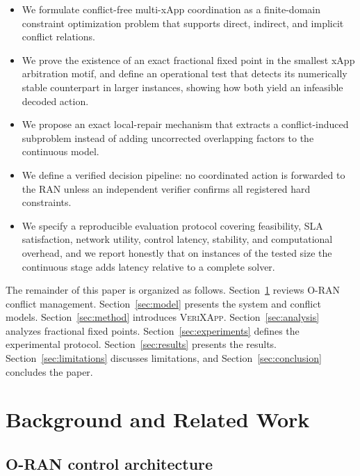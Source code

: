 \documentclass[pdflatex,sn-mathphys-num,iicol,oneside]{sn-jnl}
\newcommand{\method}{\textsc{VeriXApp}}
\begin{document}
\begin{itemize}
    \item We formulate conflict-free multi-xApp coordination as a
    finite-domain constraint optimization problem that supports
    direct, indirect, and implicit conflict relations.

    \item We prove the existence of an exact fractional fixed point in
    the smallest xApp arbitration motif, and define an operational
    test that detects its numerically stable counterpart in larger
    instances, showing how both yield an infeasible decoded action.

    \item We propose an exact local-repair mechanism that extracts a
    conflict-induced subproblem instead of adding uncorrected
    overlapping factors to the continuous model.

    \item We define a verified decision pipeline: no coordinated
    action is forwarded to the RAN unless an independent verifier
    confirms all registered hard constraints.

    \item We specify a reproducible evaluation protocol covering
    feasibility, SLA satisfaction, network utility, control latency,
    stability, and computational overhead, and we report honestly
    that on instances of the tested size the continuous stage adds
    latency relative to a complete solver.
\end{itemize}

The remainder of this paper is organized as follows.
Section~\ref{sec:background} reviews O-RAN conflict management.
Section~\ref{sec:model} presents the system and conflict models.
Section~\ref{sec:method} introduces \method.
Section~\ref{sec:analysis} analyzes fractional fixed points.
Section~\ref{sec:experiments} defines the experimental protocol.
Section~\ref{sec:results} presents the results.
Section~\ref{sec:limitations} discusses limitations, and
Section~\ref{sec:conclusion} concludes the paper.

\section{Background and Related Work}
\label{sec:background}

\subsection{O-RAN control architecture}
\end{document}
